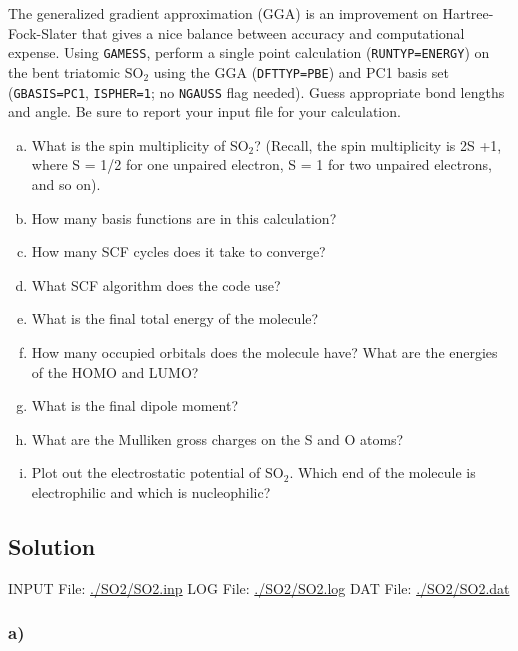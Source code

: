 \documentclass[11pt]{article}
\begin{document}
The generalized gradient approximation (GGA) is an improvement on Hartree-Fock-Slater that gives a nice balance between accuracy and computational expense. Using \texttt{GAMESS}, perform a single point calculation (\verb~RUNTYP=ENERGY~) on the bent triatomic SO$_{\text{2}}$ using the GGA (\verb~DFTTYP=PBE~) and PC1 basis set (\verb~GBASIS=PC1~, \verb~ISPHER=1~; no \verb~NGAUSS~ flag needed). Guess appropriate bond lengths and angle. Be sure to report your input file for your calculation.

\begin{enumerate}[(a)]
\item What is the spin multiplicity of SO$_{\text{2}}$? (Recall, the spin multiplicity is 2S +1, where S = 1/2 for one unpaired electron, S = 1 for two unpaired electrons, and so on).

\item How many basis functions are in this calculation?

\item How many SCF cycles does it take to converge?

\item What SCF algorithm does the code use?

\item What is the final total energy of the molecule?

\item How many occupied orbitals does the molecule have? What are the energies of the HOMO and LUMO?

\item What is the final dipole moment?

\item What are the Mulliken gross charges on the S and O atoms?

\item Plot out the electrostatic potential of SO$_{\text{2}}$. Which end of the molecule is electrophilic and which is nucleophilic?
\end{enumerate}

\subsection{Solution}
\label{sec-2-1}

INPUT File: \url{./SO2/SO2.inp}
LOG File: \url{./SO2/SO2.log}
DAT File: \url{./SO2/SO2.dat}

\subsubsection{a)}
\label{sec-2-1-1}
\end{document}
